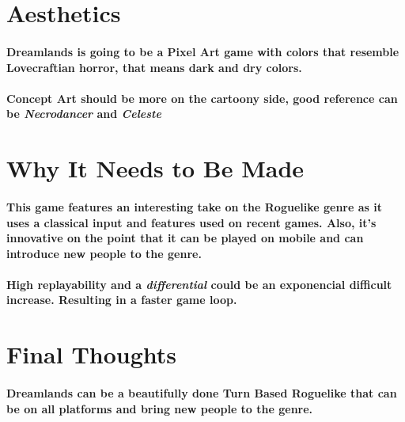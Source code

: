 \documentclass[12pt, twocolumn]{article}
\begin{document}
\section*{Aesthetics}

\paragraph{Dreamlands is going to be a Pixel Art game with colors that resemble Lovecraftian horror, that means dark and dry colors.}

\paragraph{Concept Art should be more on the cartoony side, good reference can be \emph{Necrodancer} and \emph{Celeste} }

\section*{Why It Needs to Be Made}

\paragraph{This game features an interesting take on the Roguelike genre as it uses a classical input and features used on recent games. Also, it's innovative on the point that it can be played on mobile and can introduce new people to the genre.}

\paragraph{High replayability and a \emph{differential} could be an exponencial difficult increase. Resulting in a faster game loop.}

\section*{Final Thoughts}

\paragraph{Dreamlands can be a beautifully done Turn Based Roguelike that can be on all platforms and bring new people to the genre.}
\end{document}
